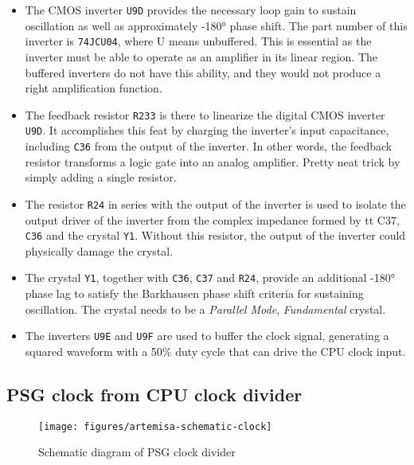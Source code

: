 \begin{itemize}
  \item The CMOS inverter {\tt U9D} provides the necessary loop gain to sustain oscillation as well as approximately -180° phase shift. The part number of this inverter is {\tt 74JCU04}, where U means unbuffered. This is essential as the inverter must be able to operate as an amplifier in its linear region. The buffered inverters do not have this ability, and they would not produce a right amplification function.
  
  \item The feedback resistor {\tt R233} is there to linearize the digital CMOS inverter {\tt U9D}. It accomplishes this feat by charging the inverter's input capacitance, including {\tt C36} from the output of the inverter. In other words, the feedback resistor transforms a logic gate into an analog
  amplifier. Pretty neat trick by simply adding a single resistor.

  \item The resistor {\tt R24} in series with the output of the inverter is used to isolate the output driver of the inverter from the complex impedance formed by {tt C37}, {\tt C36} and the crystal {\tt Y1}. Without this resistor, the output of the inverter could physically damage the crystal.
  
  \item The crystal {\tt Y1}, together with {\tt C36}, {\tt C37} and {\tt R24}, provide an additional -180° phase lag to satisfy the Barkhausen phase shift criteria for sustaining oscillation. The crystal needs to be a {\it Parallel Mode}, {\it Fundamental} crystal.
  
  \item The inverters {\tt U9E} and {\tt U9F} are used to buffer the clock signal, generating a squared waveform with a 50\% duty cycle that can drive the CPU clock input.
\end{itemize}

\subsection{PSG clock from CPU clock divider}

\begin{figure}[h]
  \centering
  \texttt{[image: figures/artemisa-schematic-clock]}
  \caption{Schematic diagram of PSG clock divider}
  \label{fig:artemisa-schematic-psg-clock}
\end{figure}

